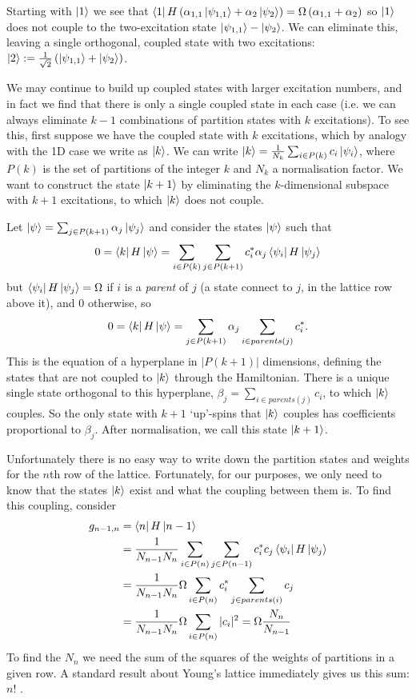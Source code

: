       Starting with $\left\vert1\right\rangle$ we see that $\left\langle 1\right\vert H\left(\alpha_{1,1}\left\vert\psi_{1,1}\right\rangle+ \alpha_{2}\left\vert\psi_{2}\right\rangle\right) =\Omega\left(\alpha_{1,1}+ \alpha_{2}\right)$ so $\left\vert1\right\rangle$ does not couple to the two-excitation state $\left\vert\psi_{1,1}\right\rangle-\left\vert\psi_{2}\right\rangle$. We can eliminate this, leaving a single orthogonal, coupled state with two excitations: $\left\vert2\right\rangle := \frac{1}{\sqrt{2}}\left( \left\vert\psi_{1,1}\right\rangle+\left\vert\psi_2\right\rangle \right)$.

      We may continue to build up coupled states with larger excitation numbers, and in fact we find that there is only a single coupled state in each case (i.e. we can always eliminate $k-1$ combinations of partition states with $k$ excitations).  To see this, first suppose we have the coupled state with $k$ excitations, which by analogy with the 1D case we write as $\left\vert k\right\rangle$. We can write $\left\vert k\right\rangle=\frac{1}{N_k}\sum_{i\in P(k)}c_{i}\left\vert\psi_{i}\right\rangle$, where $P(k)$ is the set of partitions of the integer $k$ and $N_k$ a normalisation factor. We want to construct the state $\left\vert k+1\right\rangle$ by eliminating the $k$-dimensional subspace with $k+1$ excitations, to which $\left\vert k\right\rangle$ does not couple.

      Let $\left\vert\psi\right\rangle=\sum_{j\in P(k+1)}\alpha_{j}\left\vert\psi_{j}\right\rangle$ and consider the states $\left\vert\psi\right\rangle$ such that \[ 0=\left\langle k\right\vert H\left\vert\psi\right\rangle=\sum_{i\in P(k)}\sum_{j\in P(k+1)}c_{i}^{*}\alpha_{j}\left\langle \psi_{i}\right\vert H\left\vert\psi_{j}\right\rangle\] but $\left\langle \psi_{i}\right\vert H\left\vert\psi_{j}\right\rangle=\Omega$ if $i$ is a {\it parent} of $j$ (a state connect to $j$, in the lattice row above it), and $0$ otherwise, so \[0=\left\langle k\right\vert H\left\vert\psi\right\rangle=\sum_{j\in P(k+1)}\alpha_{j}\sum_{i\in parents(j)}c_{i}^{*}.\] This is the equation of a hyperplane in $|P(k+1)|$ dimensions, defining the states that are not coupled to $\left\vert k\right\rangle$ through the Hamiltonian.  There is a unique single state orthogonal to this hyperplane, $\beta_{j}=\sum_{i\in parents(j)}c_{i}$, to which $\left\vert k\right\rangle$ couples.  So the only state with $k+1$ `up'-spins that $\left\vert k\right\rangle$ couples has coefficients proportional to $\beta_{j}$. After normalisation, we call this state $\left\vert k+1\right\rangle$.

      Unfortunately there is no easy way to write down the partition states and weights for the $n$th row of the lattice. Fortunately, for our purposes, we only need to know that the states $\left\vert k\right\rangle$ exist and what the coupling between them is. To find this coupling, consider
      \begin{align}
      g_{n-1,n} & = \left\langle n\right\vert H\left\vert n-1\right\rangle \nonumber\\
        & = \frac{1}{N_{n-1}N_n}\sum_{i\in P(n)}\sum_{j\in
          P(n-1)}c_{i}^{*}c_{j}\left\langle \psi_{i}\right\vert H\left\vert\psi_{j}\right\rangle \nonumber\\
            & = \frac{1}{N_{n-1}N_n}\Omega\sum_{i\in P(n)}c_{i}^{*}\sum_{j\in
              parents(i)}c_{j} \nonumber\\
                & = \frac{1}{N_{n-1}N_n}\Omega\sum_{i\in P(n)}|c_{i}|^{2} =
                \Omega\frac{ N_n}{N_{n-1}}\label{coupling_as_sum_c2}\end{align}
                To find the $N_n$ we need the sum of the squares of the weights of partitions in a given row. A standard result about Young's lattice immediately gives us this sum: $n!$ \cite{STANLEY:1975p6605}.

